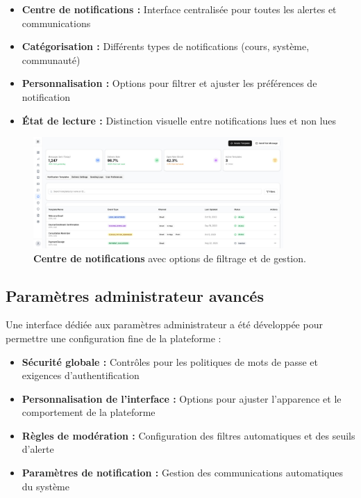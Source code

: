 \begin{itemize}
  \item \textbf{Centre de notifications :} Interface centralisée pour toutes les alertes et communications
  \item \textbf{Catégorisation :} Différents types de notifications (cours, système, communauté)
  \item \textbf{Personnalisation :} Options pour filtrer et ajuster les préférences de notification
  \item \textbf{État de lecture :} Distinction visuelle entre notifications lues et non lues
\end{itemize}

\begin{figure}[h!]
  \centering
  \includegraphics[width=0.85\textwidth,keepaspectratio]{old-reports/week_4_img/notifi.jpeg}
  \caption{\textbf{Centre de notifications} avec options de filtrage et de gestion.}
  \label{fig:notification_center}
\end{figure}

\subsection{Paramètres administrateur avancés}

Une interface dédiée aux paramètres administrateur a été développée pour permettre une configuration fine de la plateforme :

\begin{itemize}
  \item \textbf{Sécurité globale :} Contrôles pour les politiques de mots de passe et exigences d'authentification
  \item \textbf{Personnalisation de l'interface :} Options pour ajuster l'apparence et le comportement de la plateforme
  \item \textbf{Règles de modération :} Configuration des filtres automatiques et des seuils d'alerte
  \item \textbf{Paramètres de notification :} Gestion des communications automatiques du système
\end{itemize}

